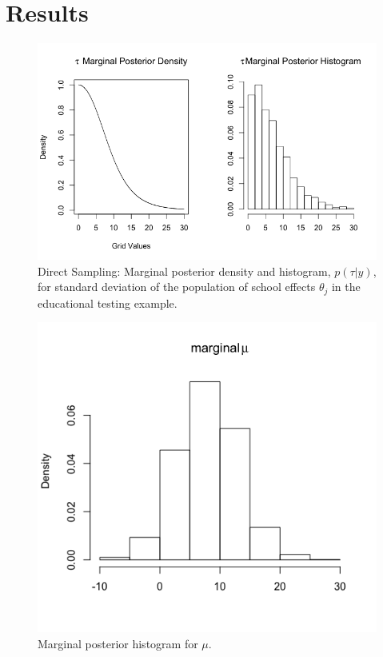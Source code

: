 \documentclass[a4paper, 9pt]{article}
\begin{document}
\section{Results}
\begin{figure}[h!]
    \centering
    \includegraphics[scale =0.6]{DS_Tau.png}
    \caption{Direct Sampling: Marginal posterior density and histogram, $p(\tau|y)$, for standard deviation of the population of school effects $\theta_j$ in the educational testing example.
}
    \label{DS_tau}
\end{figure}

\begin{figure}[h!]
    \centering
    \includegraphics[scale = 0.4]{DS_mu.png}
    \caption{Marginal posterior histogram for $\mu$.}
    \label{DSMu}
\end{figure}
\end{document}
